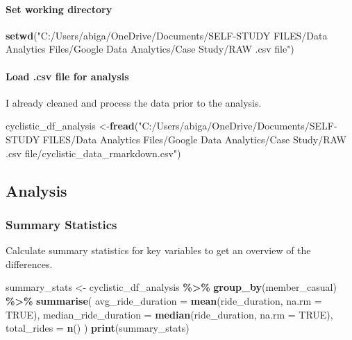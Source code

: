 \documentclass[
]{article}
\newenvironment{Shaded}{\begin{snugshade}}{\end{snugshade}}
\newcommand{\AttributeTok}[1]{\textcolor[rgb]{0.13,0.29,0.53}{#1}}
\newcommand{\ConstantTok}[1]{\textcolor[rgb]{0.56,0.35,0.01}{#1}}
\newcommand{\FunctionTok}[1]{\textcolor[rgb]{0.13,0.29,0.53}{\textbf{#1}}}
\newcommand{\NormalTok}[1]{#1}
\newcommand{\OtherTok}[1]{\textcolor[rgb]{0.56,0.35,0.01}{#1}}
\newcommand{\SpecialCharTok}[1]{\textcolor[rgb]{0.81,0.36,0.00}{\textbf{#1}}}
\newcommand{\StringTok}[1]{\textcolor[rgb]{0.31,0.60,0.02}{#1}}
\begin{document}
\paragraph{Set working directory}\label{set-working-directory}

\begin{Shaded}
\begin{Highlighting}[]
\FunctionTok{setwd}\NormalTok{(}\StringTok{"C:/Users/abiga/OneDrive/Documents/SELF{-}STUDY FILES/Data Analytics Files/Google Data Analytics/Case Study/RAW .csv file"}\NormalTok{)}
\end{Highlighting}
\end{Shaded}

\paragraph{Load .csv file for
analysis}\label{load-.csv-file-for-analysis}

I already cleaned and process the data prior to the analysis.

\begin{Shaded}
\begin{Highlighting}[]
\NormalTok{cyclistic\_df\_analysis }\OtherTok{\textless{}{-}}\FunctionTok{fread}\NormalTok{(}\StringTok{"C:/Users/abiga/OneDrive/Documents/SELF{-}STUDY FILES/Data Analytics Files/Google Data Analytics/Case Study/RAW .csv file/cyclistic\_data\_rmarkdown.csv"}\NormalTok{)}
\end{Highlighting}
\end{Shaded}

\subsection{Analysis}\label{analysis}

\subsubsection{Summary Statistics}\label{summary-statistics}

Calculate summary statistics for key variables to get an overview of the
differences.

\begin{Shaded}
\begin{Highlighting}[]
\NormalTok{summary\_stats }\OtherTok{\textless{}{-}}\NormalTok{ cyclistic\_df\_analysis }\SpecialCharTok{\%\textgreater{}\%}
  \FunctionTok{group\_by}\NormalTok{(member\_casual) }\SpecialCharTok{\%\textgreater{}\%}
  \FunctionTok{summarise}\NormalTok{(}
    \AttributeTok{avg\_ride\_duration =} \FunctionTok{mean}\NormalTok{(ride\_duration, }\AttributeTok{na.rm =} \ConstantTok{TRUE}\NormalTok{),}
    \AttributeTok{median\_ride\_duration =} \FunctionTok{median}\NormalTok{(ride\_duration, }\AttributeTok{na.rm =} \ConstantTok{TRUE}\NormalTok{),}
    \AttributeTok{total\_rides =} \FunctionTok{n}\NormalTok{()}
\NormalTok{  )}
\FunctionTok{print}\NormalTok{(summary\_stats)}
\end{Highlighting}
\end{Shaded}
\end{document}
